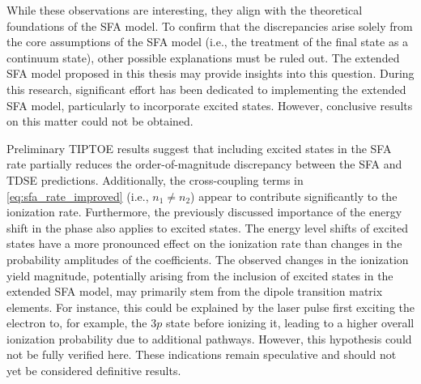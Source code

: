While these observations are interesting, they align with the theoretical foundations of the SFA model.
To confirm that the discrepancies arise solely from the core assumptions of the SFA model (i.e., the treatment of the final state as a continuum state), other possible explanations must be ruled out.
The extended SFA model proposed in this thesis may provide insights into this question.
During this research, significant effort has been dedicated to implementing the extended SFA model, particularly to incorporate excited states.
However, conclusive results on this matter could not be obtained.

Preliminary TIPTOE results suggest that including excited states in the SFA rate partially reduces the order-of-magnitude discrepancy between the SFA and TDSE predictions.
Additionally, the cross-coupling terms in \eqref{eq:sfa_rate_improved} (i.e., $n_1 \neq n_2$) appear to contribute significantly to the ionization rate.
Furthermore, the previously discussed importance of the energy shift in the phase also applies to excited states.
The energy level shifts of excited states have a more pronounced effect on the ionization rate than changes in the probability amplitudes of the coefficients.
The observed changes in the ionization yield magnitude, potentially arising from the inclusion of excited states in the extended SFA model, may primarily stem from the dipole transition matrix elements.
For instance, this could be explained by the laser pulse first exciting the electron to, for example, the $3p$ state before ionizing it, leading to a higher overall ionization probability due to additional pathways.
However, this hypothesis could not be fully verified here.
These indications remain speculative and should not yet be considered definitive results.





